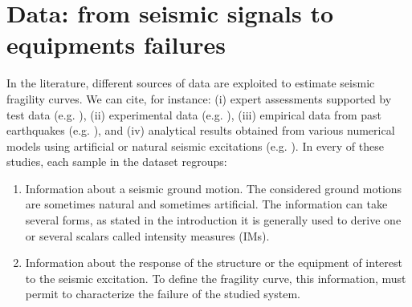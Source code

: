 






\section{Data: from seismic signals to equipments failures}\label{sec:intro-frags:data}





In the literature, different sources of data are exploited to estimate seismic fragility curves. 
We can cite, for instance:
(i) expert assessments supported by test data (e.g. \cite{kennedy_probabilistic_1980,kennedy_seismic_1984,zentner_fragility_2017}), (ii) experimental data (e.g. \cite{park_survey_1998}), (iii) empirical data from past earthquakes (e.g. \cite{shinozuka_statistical_2000,straub_improved_2008,lallemant_statistical_2015,buratti_empirical_2017,laguerre_empirical_2024}), and (iv) analytical results obtained from various numerical models using artificial or natural seismic excitations (e.g. \cite{ellingwood_earthquake_2001,kim_development_2004,zentner_numerical_2010,koutsourelakis_assessing_2010,mai_seismic_2017,trevlopoulos_parametric_2019,wang_influence_2020,mandal_seismic_2016,wang_seismic_2018,wang_bayesian_2018,zhao_seismic_2020,katayama_bayesian-estimation-based_2021,gauchy_importance_2021,khansefid_fragility_2023,lee_efficient_2023}).
In every of these studies, each sample in 
the dataset regroups:
\begin{enumerate}
    \item Information about a seismic ground motion. The considered ground motions are sometimes natural and sometimes artificial. The information can take several forms, %
    as stated in the introduction it is generally used  to derive one or several scalars called intensity measures (IMs).
    \item Information about the response of the structure or the equipment of interest to the seismic excitation. To define the fragility curve, this information, must permit to characterize the failure of the studied system.
\end{enumerate}


